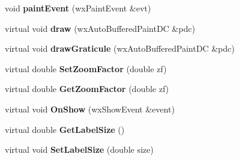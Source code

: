 \begin{DoxyCompactItemize}
\item 
\hypertarget{class_plot_panel_a042c9df2ebe0c245d9fb5f3aa63595bc}{void {\bfseries paint\-Event} (wx\-Paint\-Event \&evt)}\label{class_plot_panel_a042c9df2ebe0c245d9fb5f3aa63595bc}

\item 
\hypertarget{class_plot_panel_a974601747a67a4637a3a133cefe70c13}{virtual void {\bfseries draw} (wx\-Auto\-Buffered\-Paint\-D\-C \&pdc)}\label{class_plot_panel_a974601747a67a4637a3a133cefe70c13}

\item 
\hypertarget{class_plot_panel_a5444b418c756380e5e08f86a34615be3}{virtual void {\bfseries draw\-Graticule} (wx\-Auto\-Buffered\-Paint\-D\-C \&pdc)}\label{class_plot_panel_a5444b418c756380e5e08f86a34615be3}

\item 
\hypertarget{class_plot_panel_a8e8722d1f4c02f166f7acd6905ea4009}{virtual double {\bfseries Set\-Zoom\-Factor} (double zf)}\label{class_plot_panel_a8e8722d1f4c02f166f7acd6905ea4009}

\item 
\hypertarget{class_plot_panel_a6f6ef3db5a4b4f6cb50d92a38fa36dbd}{virtual double {\bfseries Get\-Zoom\-Factor} (double zf)}\label{class_plot_panel_a6f6ef3db5a4b4f6cb50d92a38fa36dbd}

\item 
\hypertarget{class_plot_panel_a3858e2d6bd9f1cfc900c5a1c7391e0fb}{virtual void {\bfseries On\-Show} (wx\-Show\-Event \&event)}\label{class_plot_panel_a3858e2d6bd9f1cfc900c5a1c7391e0fb}

\item 
\hypertarget{class_plot_panel_a539ab140f79c5cff29031aa312a9f159}{virtual double {\bfseries Get\-Label\-Size} ()}\label{class_plot_panel_a539ab140f79c5cff29031aa312a9f159}

\item 
\hypertarget{class_plot_panel_a2fcb6c7fc21c942122b0a8f4d4a9af2d}{virtual void {\bfseries Set\-Label\-Size} (double size)}\label{class_plot_panel_a2fcb6c7fc21c942122b0a8f4d4a9af2d}

\end{DoxyCompactItemize}
